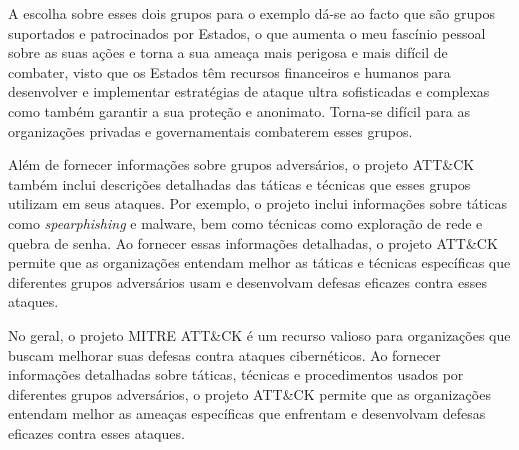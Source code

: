 A escolha sobre esses dois grupos para o exemplo dá-se ao facto que são grupos suportados e patrocinados por Estados, o que aumenta o meu fascínio pessoal sobre as suas ações e torna a sua ameaça mais perigosa e mais difícil de combater, visto que os Estados têm recursos financeiros e humanos para desenvolver e implementar estratégias de ataque ultra sofisticadas e complexas como também garantir a sua proteção e anonimato. Torna-se difícil para as organizações privadas e governamentais combaterem esses grupos.

Além de fornecer informações sobre grupos adversários, o projeto ATT\&CK também inclui descrições detalhadas das táticas e técnicas que esses grupos utilizam em seus ataques. Por exemplo, o projeto inclui informações sobre táticas como \textit{spearphishing} e malware, bem como técnicas como exploração de rede e quebra de senha. Ao fornecer essas informações detalhadas, o projeto ATT\&CK permite que as organizações entendam melhor as táticas e técnicas específicas que diferentes grupos adversários usam e desenvolvam defesas eficazes contra esses ataques.

No geral, o projeto MITRE ATT\&CK é um recurso valioso para organizações que buscam melhorar suas defesas contra ataques cibernéticos. Ao fornecer informações detalhadas sobre táticas, técnicas e procedimentos usados por diferentes grupos adversários, o projeto ATT\&CK permite que as organizações entendam melhor as ameaças específicas que enfrentam e desenvolvam defesas eficazes contra esses ataques.

\newpage
